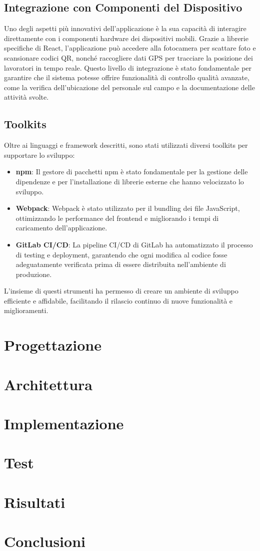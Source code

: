 \documentclass[twoside]{supsistudent}
\begin{document}
\section{Integrazione con Componenti del Dispositivo}

Uno degli aspetti più innovativi dell'applicazione è la sua capacità di interagire direttamente con i componenti hardware dei dispositivi mobili. Grazie a librerie specifiche di React, l'applicazione può accedere alla fotocamera per scattare foto e scansionare codici QR, nonché raccogliere dati GPS per tracciare la posizione dei lavoratori in tempo reale. Questo livello di integrazione è stato fondamentale per garantire che il sistema potesse offrire funzionalità di controllo qualità avanzate, come la verifica dell'ubicazione del personale sul campo e la documentazione delle attività svolte.

\section{Toolkits}

Oltre ai linguaggi e framework descritti, sono stati utilizzati diversi toolkits per supportare lo sviluppo:

\begin{itemize}
  \item \textbf{npm}: Il gestore di pacchetti npm è stato fondamentale per la gestione delle dipendenze e per l'installazione di librerie esterne che hanno velocizzato lo sviluppo.
  \item \textbf{Webpack}: Webpack è stato utilizzato per il bundling dei file JavaScript, ottimizzando le performance del frontend e migliorando i tempi di caricamento dell'applicazione.
  \item \textbf{GitLab CI/CD}: La pipeline CI/CD di GitLab ha automatizzato il processo di testing e deployment, garantendo che ogni modifica al codice fosse adeguatamente verificata prima di essere distribuita nell'ambiente di produzione.
\end{itemize}

L'insieme di questi strumenti ha permesso di creare un ambiente di sviluppo efficiente e affidabile, facilitando il rilascio continuo di nuove funzionalità e miglioramenti.

\chapter{Progettazione}
\chapter{Architettura}
\chapter{Implementazione}
\chapter{Test}
\chapter{Risultati}
\chapter{Conclusioni}


\cite{1705631}


\end{document}
